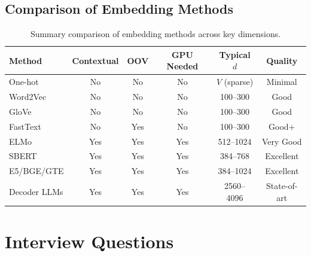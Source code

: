 \subsection{Comparison of Embedding Methods}

\begin{table}[H]
\centering
\caption{Summary comparison of embedding methods across key dimensions.}
\label{tab:embedding_comparison}
\begin{tabularx}{\textwidth}{l c c c c c}
\toprule
\textbf{Method} & \textbf{Contextual} & \textbf{OOV} &
\textbf{GPU Needed} & \textbf{Typical $d$} & \textbf{Quality} \\
\midrule
One-hot       & No  & No  & No  & $V$ (sparse)  & Minimal \\
Word2Vec      & No  & No  & No  & 100--300      & Good \\
GloVe         & No  & No  & No  & 100--300      & Good \\
FastText      & No  & Yes & No  & 100--300      & Good+ \\
ELMo          & Yes & Yes & Yes & 512--1024     & Very Good \\
SBERT         & Yes & Yes & Yes & 384--768      & Excellent \\
E5/BGE/GTE    & Yes & Yes & Yes & 384--1024     & Excellent \\
Decoder LLMs  & Yes & Yes & Yes & 2560--4096    & State-of-art \\
\bottomrule
\end{tabularx}
\end{table}


\section{Interview Questions}
\label{sec:embedding_interview}


